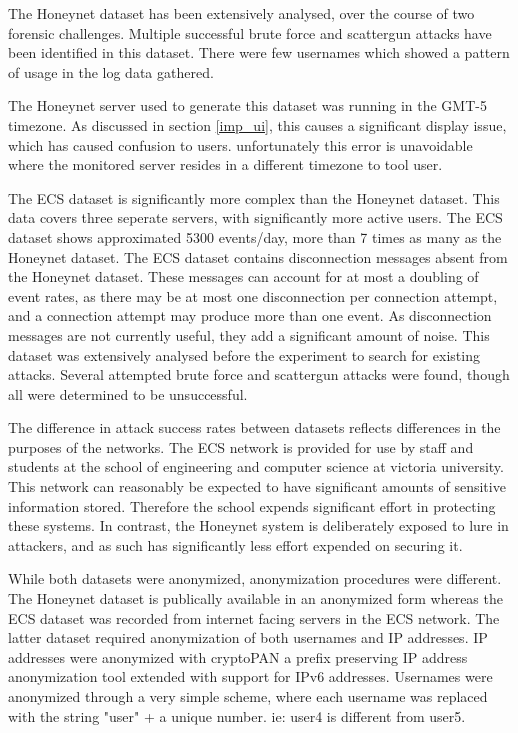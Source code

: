 The Honeynet dataset has been extensively analysed, over the course of two forensic challenges. Multiple successful brute force and scattergun attacks have been identified in this dataset. There were few usernames which showed a pattern of usage in the log data gathered. 

The Honeynet server used to generate this dataset was running in the GMT-5 timezone. As discussed in section \ref{imp_ui}, this causes a significant display issue, which has caused confusion to users. unfortunately this error is unavoidable where the monitored server resides in a different timezone to tool user.

The ECS dataset is significantly more complex than the Honeynet dataset. This data covers three seperate servers, with significantly more active users. The ECS dataset shows approximated 5300 events/day, more than 7 times as many as the Honeynet dataset. The ECS dataset contains disconnection messages absent from the Honeynet dataset. These messages can account for at most a doubling of event rates, as there may be at most one disconnection per connection attempt, and a connection attempt may produce more than one event. As disconnection messages are not currently useful, they add a significant amount of noise. This dataset was extensively analysed before the experiment to search for existing attacks. Several attempted brute force and scattergun attacks were found, though all were determined to be unsuccessful.  

The difference in attack success rates between datasets reflects differences in the purposes of the networks. The ECS network is provided for use by staff and students at the school of engineering and computer science at victoria university. This network can reasonably be expected to have significant amounts of sensitive information stored. Therefore the school expends significant effort in protecting these systems. In contrast, the Honeynet system is deliberately exposed to lure in attackers, and as such has significantly less effort expended on securing it.

While both datasets were anonymized, anonymization procedures were different. The Honeynet dataset is publically available in an anonymized form \cite{forensic10} whereas the ECS dataset was recorded from internet facing servers in the ECS network. The latter dataset required anonymization of both usernames and IP addresses. IP addresses were anonymized with cryptoPAN \cite{xu2002prefix} a prefix preserving IP address anonymization tool extended with support for IPv6 addresses. Usernames were anonymized through a very simple scheme, where each username was replaced with the string "user" + a unique number. ie: user4 is different from user5.

